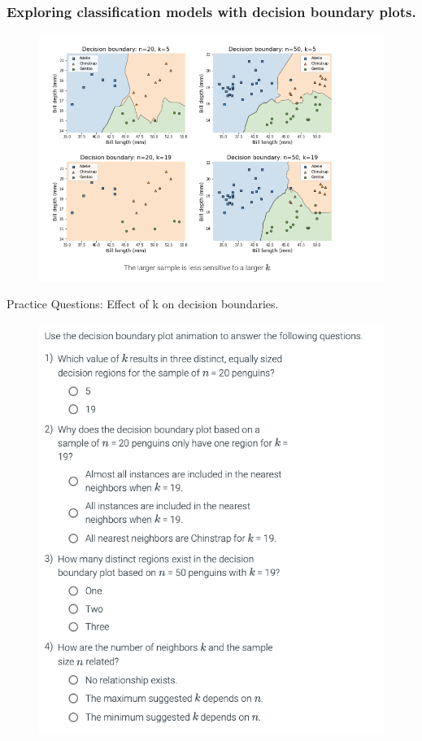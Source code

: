 \documentclass[8pt,dvipsnames]{beamer}
\begin{document}
\begin{frame}
	\frametitle{Exploring classification models with decision boundary plots.}
	\begin{figure}[ht]
		\centering
		\includegraphics[width=\linewidth]{imgs/knn_31.png}
	\end{figure}
\end{frame}
\begin{frame}{Practice Questions: Effect of k on decision boundaries.}

	\begin{figure}[ht]
		\centering
		\includegraphics[scale=0.25]{imgs/knn_32.png}
	\end{figure}

\end{frame}
\end{document}
